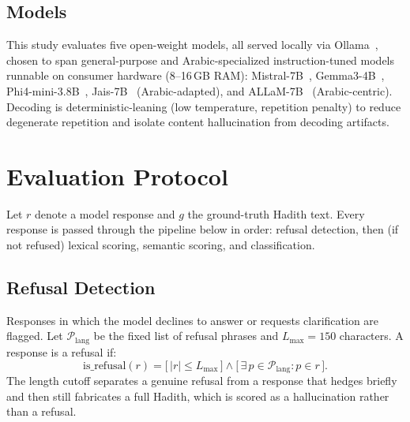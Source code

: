 \documentclass{article}
\begin{document}
\subsection{Models}
This study evaluates five open-weight models, all served locally via
Ollama~\cite{ollama}, chosen to span general-purpose and Arabic-specialized
instruction-tuned models runnable on consumer hardware (8--16\,GB RAM):
Mistral-7B~\cite{mistral}, Gemma3-4B~\cite{gemma3}, Phi4-mini-3.8B~\cite{phi4mini},
Jais-7B~\cite{jais} (Arabic-adapted), and ALLaM-7B~\cite{allam}
(Arabic-centric). Decoding is deterministic-leaning (low temperature,
repetition penalty) to reduce degenerate repetition and isolate content
hallucination from decoding artifacts.


\section{Evaluation Protocol}
\label{sec:eval}

Let $r$ denote a model response and $g$ the ground-truth Hadith text. Every
response is passed through the pipeline below in order: refusal detection, then
(if not refused) lexical scoring, semantic scoring, and classification.

\subsection{Refusal Detection}
\label{sec:refusal}
Responses in which the model declines to answer or requests clarification
are flagged. Let $\mathcal{P}_{\text{lang}}$ be the fixed list of refusal
phrases and $L_{\max}=150$ characters. A response is a refusal if:
\begin{equation}
  \mathrm{is\_refusal}(r)
    = \bigl[\,|r| \le L_{\max}\,\bigr]
      \wedge
      \bigl[\,\exists\,p \in \mathcal{P}_{\text{lang}} : p \in r\,\bigr].
  \label{eq:refusal}
\end{equation}
The length cutoff separates a genuine refusal from a response that hedges
briefly and then still fabricates a full Hadith, which is scored as a
hallucination rather than a refusal.
\end{document}
